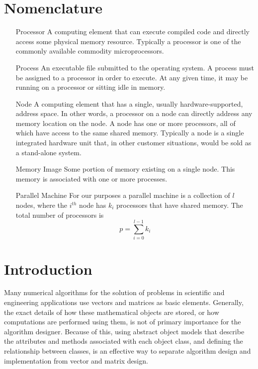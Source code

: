 \documentclass[12pt,relax]{PetraObjectModel}
\begin{document}
\section*{Nomenclature}
\begin{itemize}
\item[Processor] A computing element that can execute compiled 
code and directly access some physical memory resource.  Typically 
a processor is one of the commonly available commodity microprocessors.

\item[Process] An executable file submitted to the operating system.  
A process must be assigned to a processor in order to execute.  At 
any given time, it may be running on a processor or sitting idle in 
memory.

\item[Node] A computing element that has a single, usually 
hardware-supported, address space.  In other words, a processor 
on a node can directly address any memory location on the node.  
A node has one or more processors, all of which have access to the 
same shared memory.  Typically a node is a single integrated hardware 
unit that, in other customer situations, would be sold as a
stand-alone 
system.

\item[Memory Image]  Some portion of memory existing on a single node.
This memory is associated with one or more processes.


\item[Parallel Machine] For our purposes a parallel machine is a
collection of $l$ nodes, where the $i^{th}$ node has $k_i$ processors that have 
shared memory.  The total number of processors is 
\begin{equation}
p = \sum_{i=0}^{l-1} k_i
\end{equation}

\end{itemize}

\newpage

\section{Introduction}


Many numerical algorithms for the solution of problems in 
scientific and engineering applications use vectors and 
matrices as basic elements.   Generally, the exact details 
of how these mathematical objects are stored, or how computations 
are performed using them, is not of primary importance for the 
algorithm designer.  Because of this, using abstract object models 
that describe the attributes and methods associated with each 
object class, and defining the relationship between classes, is an 
effective way to separate algorithm design and implementation from 
vector and matrix design.
\end{document}
